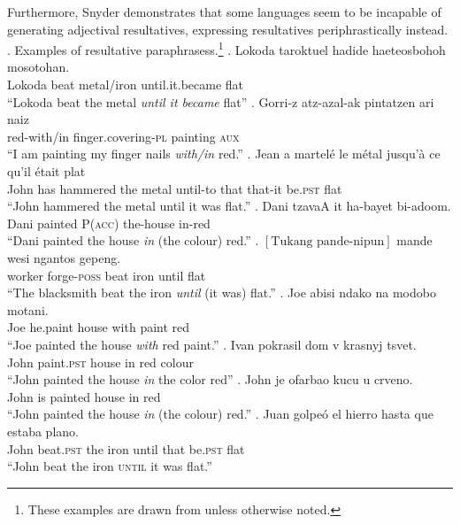 \documentclass[MilwayThesis]{subfiles}
\begin{document}
Furthermore, Snyder demonstrates that some languages seem to be incapable of generating adjectival resultatives, expressing resultatives periphrastically instead.
\ex. Examples of resultative paraphrasess.\footnote{These examples are drawn from \textcite{snyder2001nature} unless otherwise noted.}
\ag. Lokoda taroktuel hadide haete\textglotstop{}osbohoh mosoto\textglotstop{}han.\\
Lokoda beat metal/iron until.it.became flat\\
``Lokoda beat the metal \textit{until it became} flat''
\bg. Gorri-z atz-azal-ak pintatzen ari naiz\\
red-with/in finger.covering-\textsc{pl} painting \textsc{aux}\\
``I am painting my finger nails \textit{with/in} red.''
\bg. Jean a martel\'{e} le m\'{e}tal jusqu'\`{a} ce qu'il \'{e}tait plat\\
John has hammered the metal until-to that that-it be.\textsc{pst} flat\\
``John hammered the metal until it was flat.''
\bg. Dani tzavaA \textglotstop{}it ha-bayet bi-\textglotstop{}adoom.\\
Dani painted P(\textsc{acc}) the-house in-red\\
``Dani painted the house \textit{in} (the colour) red.''
\bg. $\left[\text{Tukang pande-nipun}\right]$ mande wesi ngantos gepeng.\\
{worker forge-\textsc{poss}} beat iron until flat\\
``The blacksmith beat the iron \textit{until} (it was) flat.''
\bg. Joe abisi ndako na modobo motani.\\
Joe he.paint house with paint red\\
``Joe painted the house \textit{with} red paint.''
\bg. Ivan pokrasil dom v krasnyj tsvet.\\
John paint.\textsc{pst} house in red colour\\
``John painted the house \textit{in} the color red''
\bg. John je ofarbao kucu u crveno.\\
John is painted house in red\\
``John painted the house \textit{in} (the colour) red.''
\bg. Juan golpe\'{o} el hierro hasta que estaba plano.\\
John beat.\textsc{pst} the iron until that be.\textsc{pst} flat\\
``John beat the iron \textsc{until} it was flat.''
\end{document}
